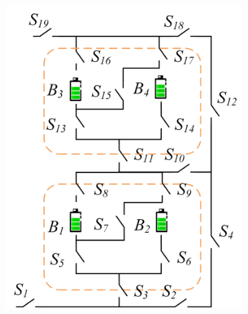 \documentclass{article}
\begin{document}
\begin{figure}[htbp]
    \centering
    \begin{subfigure}[b]{0.45\textwidth}
        \includegraphics[width=\textwidth]{../attachments/arch-ef.png}
        \caption{}
        \label{fig:arch-ef}
    \end{subfigure}
    \hspace{0.05\textwidth}
    \begin{subfigure}[b]{0.45\textwidth}

\end{subfigure}
\end{figure}
\end{document}
